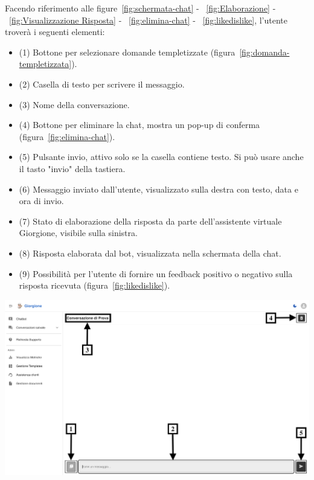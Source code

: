Facendo riferimento alle figure~\ref{fig:schermata-chat} - ~\ref{fig:Elaborazione} - ~\ref{fig:Visualizzazione Risposta} - ~\ref{fig:elimina-chat} - ~\ref{fig:likedislike}, l'utente troverà i seguenti elementi:
\begin{itemize}
    \item (1) Bottone per selezionare domande templetizzate (figura~\ref{fig:domanda-templetizzata}).
    \item (2) Casella di testo per scrivere il messaggio.
    \item (3) Nome della conversazione.
    \item (4) Bottone per eliminare la chat, mostra un pop-up di conferma (figura~\ref{fig:elimina-chat}).
    \item (5) Pulsante invio, attivo solo se la casella contiene testo. Si può usare anche il tasto "invio" della tastiera.
    \item (6) Messaggio inviato dall'utente, visualizzato sulla destra con testo, data e ora di invio. 
    \item (7) Stato di elaborazione della risposta da parte dell’assistente virtuale Giorgione, visibile sulla sinistra.
    \item (8) Risposta elaborata dal bot, visualizzata nella schermata della chat. 
    \item (9) Possibilità per l’utente di fornire un feedback positivo o negativo sulla risposta ricevuta (figura~\ref{fig:likedislike}).
\end{itemize}

\begin{center}
    \includegraphics[width=\textwidth]{./img/SchermataChat1.png}
    \label{fig:schermata-chat}
\end{center}

